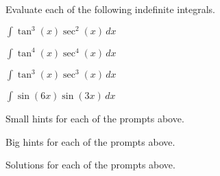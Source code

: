 \begin{activity} \label{A:5.2.2}  Evaluate each of the following indefinite integrals.  

\bmtwo
\ba
	\item $\int \tan^3(x)\sec^2(x) \, dx$
	\item $\int \tan^4(x)\sec^4(x) \, dx$
	\item $\int \tan^3(x)\sec^3(x) \, dx $
	\item $\int \sin(6x)\sin(3x) \, dx $
\ea
\emtwo
\end{activity}
\begin{smallhint}
\ba
	\item Small hints for each of the prompts above.
\ea
\end{smallhint}
\begin{bighint}
\ba
	\item Big hints for each of the prompts above.
\ea
\end{bighint}
\begin{activitySolution}
\ba
	\item Solutions for each of the prompts above.
\ea
\end{activitySolution}
\aftera